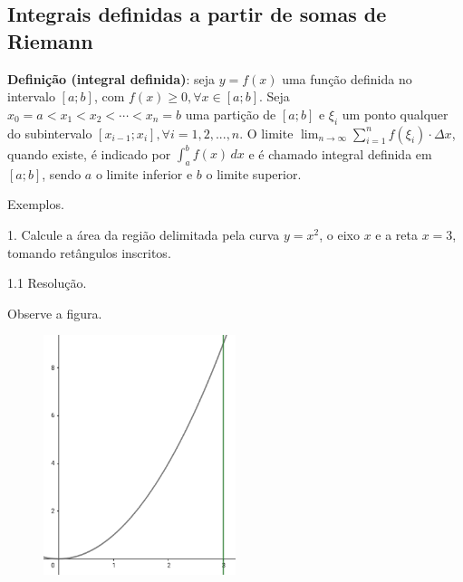 \documentclass{article}
\begin{document}
{\begin{newpage}
\subsection{Integrais definidas a partir de somas de Riemann}
\hspace{12pt}
\textbf{Definição (integral definida)}: seja $y=f(x)$ uma função definida no intervalo $[a;b]$, com $f(x)\geq 0, \forall x\in [a;b]$. Seja $x_0 = a < x_1 < x_2 < \cdots < x_n = b$ uma partição de $[a;b]$ e $\xi _i$ um ponto qualquer do subintervalo $[x_{i-1} ;x_i ], \forall i=1,2,...,n$. O limite $\displaystyle{\lim_{n\to \infty } \sum_{i=1}^{n} f(\xi _i)\cdot\Delta x}$, quando existe, é indicado por $\displaystyle{\int_{a}^{b} f(x)\, dx}$ e é chamado integral definida em $[a;b]$, sendo $a$ o limite inferior e $b$ o limite superior. 
\par
\vspace{0.3cm}
Exemplos.
\par
\vspace{0.3cm}
\begin{flushleft}
1. Calcule a área da região delimitada pela curva $y=x^2$, o eixo $x$ e a reta $x=3$, tomando retângulos inscritos.
\end{flushleft}
\par
\vspace{0.3cm}
\begin{flushleft}
1.1 Resolução.
\end{flushleft}
\par Observe a figura.
\begin{figure}[htbp]
\begin{center}
\includegraphics[width=0.5\textwidth, angle=0]{Grafico8.png}
\end{center}
\end{figure}

\end{newpage}}
\end{document}
